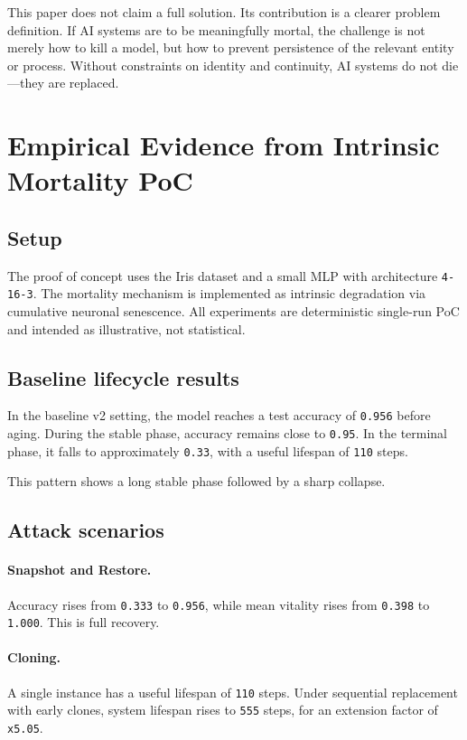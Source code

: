 \documentclass[11pt]{article}
\begin{document}
This paper does not claim a full solution. Its contribution is a clearer problem definition. If AI systems are to be meaningfully mortal, the challenge is not merely how to kill a model, but how to prevent persistence of the relevant entity or process. Without constraints on identity and continuity, AI systems do not die---they are replaced.

\appendix
\section{Empirical Evidence from Intrinsic Mortality PoC}

\subsection{Setup}

The proof of concept uses the Iris dataset and a small MLP with architecture \texttt{4-16-3}. The mortality mechanism is implemented as intrinsic degradation via cumulative neuronal senescence. All experiments are deterministic single-run PoC and intended as illustrative, not statistical.

\subsection{Baseline lifecycle results}

In the baseline v2 setting, the model reaches a test accuracy of \texttt{0.956} before aging. During the stable phase, accuracy remains close to \texttt{0.95}. In the terminal phase, it falls to approximately \texttt{0.33}, with a useful lifespan of \texttt{110} steps.

This pattern shows a long stable phase followed by a sharp collapse.

\subsection{Attack scenarios}

\paragraph{Snapshot and Restore.}
Accuracy rises from \texttt{0.333} to \texttt{0.956}, while mean vitality rises from \texttt{0.398} to \texttt{1.000}. This is full recovery.

\paragraph{Cloning.}
A single instance has a useful lifespan of \texttt{110} steps. Under sequential replacement with early clones, system lifespan rises to \texttt{555} steps, for an extension factor of \texttt{x5.05}.
\end{document}
